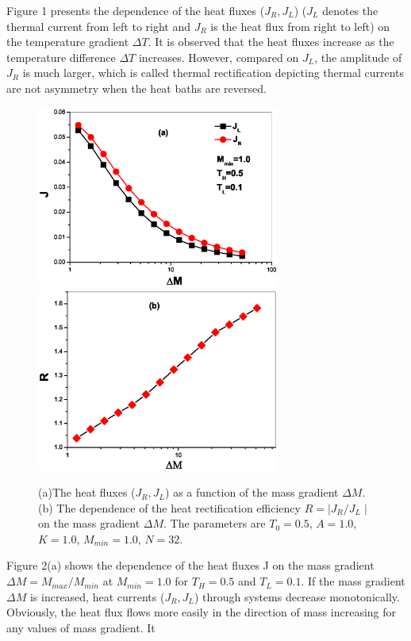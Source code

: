 \documentclass[pra,preprint,superscriptaddress,showkeys,showpacs]{revtex4}
\begin{document}
\indent Figure 1 presents the dependence of the heat fluxes
($J_{R},J_{L}$) ($J_{L}$ denotes the thermal current from left to
right and $J_{R}$ is the heat flux from right to left) on the
temperature gradient $\Delta T$. It is observed that the heat fluxes
increase as the temperature difference $\Delta T$ increases.
However, compared on $J_{L}$, the amplitude of $J_{R}$ is much
larger, which is called thermal rectification depicting thermal
currents are not asymmetry when the heat baths are reversed.\\
\begin{figure}
\centering
\includegraphics[width=8cm]{fig2a.eps}
\centering
\includegraphics[width=8cm]{fig2b.eps}
\caption{(a)The heat fluxes ($J_{R},J_{L}$) as a function of the mass
gradient $\Delta M$. (b) The dependence of the heat rectification
efficiency $R=\mid J_{R}/J_{L}\mid$ on the mass gradient $\Delta M$.
The parameters are $T_{0}=0.5$, $A=1.0$, $K=1.0$, $M_{min}=1.0$,
$N=32$.}
\end{figure}
\indent Figure 2(a) shows the dependence of the heat fluxes J on the
mass gradient $\Delta M=M_{max}/M_{min}$ at $M_{min}=1.0$ for
$T_{H}=0.5$ and $T_{L}=0.1$. If the mass gradient $\Delta M$ is
increased, heat currents ($J_{R},J_{L}$) through systems decrease
monotonically. Obviously, the heat flux flows more easily in the
direction of mass increasing for any values of mass gradient. It
\end{document}
